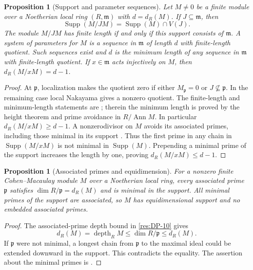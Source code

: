 \documentclass[11pt,oneside,openany]{book}
\newtheorem{proposition}[theorem]{Proposition}
\theoremstyle{definition}
\theoremstyle{remark}
\begin{document}
\begin{proposition}[Support and parameter sequences]\label{res:CM-02}
Let $M\ne0$ be a finite module over a Noetherian local ring
$(R,\mathfrak m)$ with $d=d_R(M)$. If $J\subseteq\mathfrak m$, then
\[
 \operatorname{Supp}(M/JM)=\operatorname{Supp}(M)\cap V(J).
\]
The module $M/JM$ has finite length if and only if this support
consists of $\mathfrak m$. A \emph{system of parameters} for $M$ is
a sequence in $\mathfrak m$ of length $d$ with finite-length
quotient. Such sequences exist and $d$ is the minimum length
of any sequence in $\mathfrak m$ with finite-length quotient.
If $x\in\mathfrak m$ acts injectively on $M$, then
$d_R(M/xM)=d-1$.
\end{proposition}
\begin{proof}
At $\mathfrak p$, localization makes the quotient zero if either
$M_{\mathfrak p}=0$ or $J\not\subseteq\mathfrak p$.
In the remaining case local Nakayama gives a nonzero quotient.
The finite-length and minimum-length statements are
\cite[Theorem ALG-05-C03-S01]{p103}; therein the minimum length
is proved by the height theorem and prime avoidance in
$R/\operatorname{Ann} M$. In particular
$d_R(M/xM)\ge d-1$. A nonzerodivisor on $M$ avoids its
associated primes, including those minimal in its support
\cite[Theorems ALG-05-C02-S03 and ALG-05-C02-R03]{p103}. Thus the first prime in
any chain in $\operatorname{Supp}(M/xM)$ is not minimal in
$\operatorname{Supp}(M)$. Prepending a minimal prime of the support
increases the length by one, proving $d_R(M/xM)\le d-1$.
\end{proof}

\begin{proposition}[Associated primes and equidimension]\label{res:CM-03}
For a nonzero finite Cohen--Macaulay module $M$ over a Noetherian
local ring, every associated prime $\mathfrak p$ satisfies
$\dim R/\mathfrak p=d_R(M)$ and is minimal in the support. All
minimal primes of the support are associated, so $M$ has
equidimensional support and no embedded associated primes.
\end{proposition}
\begin{proof}
The associated-prime depth bound in \ref{res:DP-10} gives
\[
 d_R(M)=\operatorname{depth}_R M\leq \dim R/\mathfrak p
 \leq d_R(M).
\]
If $\mathfrak p$ were not minimal, a longest chain from $\mathfrak p$
to the maximal ideal could be extended downward in the support.
This contradicts the equality. The assertion about the minimal
primes is \cite[Theorem ALG-05-C02-R03]{p103}.
\end{proof}
\end{document}

